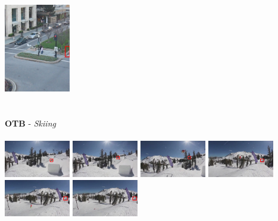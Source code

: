 \documentclass[10pt,twocolumn,letterpaper,french]{article}
\begin{document}
\begin{appendices}
\begin{center}
  \includegraphics[width=82pt, cfbox=red 1pt 1pt]{images/exemples/bof/human/000117.png}\\
   \hspace{1cm}\\
  \hspace{1cm}\\
  
  
 \textbf{OTB} - \textit{Skiing}\\
  \hspace{1cm}\\
  \includegraphics[width=82pt, cfbox=green 1pt 1pt]{images/exemples/bof/skiing/000001.png}
  \includegraphics[width=82pt, cfbox=green 1pt 1pt]{images/exemples/bof/skiing/000008.png}
  \includegraphics[width=82pt, cfbox=red 1pt 1pt]{images/exemples/bof/skiing/000024.png}
  \includegraphics[width=82pt, cfbox=red 1pt 1pt]{images/exemples/bof/skiing/000040.png}
  \includegraphics[width=82pt, cfbox=red 1pt 1pt]{images/exemples/bof/skiing/000056.png}
  \includegraphics[width=82pt, cfbox=red 1pt 1pt]{images/exemples/bof/skiing/000072.png}\\
  

\end{center}
\end{appendices}
\end{document}
